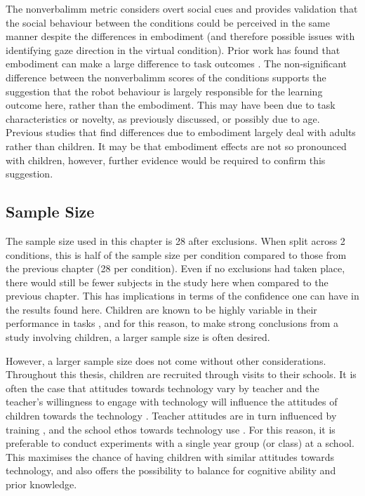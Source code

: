 The \gls{nonverbalimm} metric considers overt social cues and provides validation that the social behaviour between the conditions could be perceived in the same manner despite the differences in embodiment (and therefore possible issues with identifying gaze direction in the virtual condition). Prior work has found that embodiment can make a large difference to task outcomes \citep{bainbridge2008effect, leyzberg2014personalizing}. The non-significant difference between the \gls{nonverbalimm} scores of the conditions supports the suggestion that the robot behaviour is largely responsible for the learning outcome here, rather than the embodiment. This may have been due to task characteristics or novelty, as previously discussed, or possibly due to age. Previous studies that find differences due to embodiment largely deal with adults rather than children. It may be that embodiment effects are not so pronounced with children, however, further evidence would be required to confirm this suggestion.

\subsection{Sample Size}\label{sec:ch6-disc-sample}
The sample size used in this chapter is 28 after exclusions. When split across 2 conditions, this is half of the sample size per condition compared to those from the previous chapter (28 per condition). Even if no exclusions had taken place, there would still be fewer subjects in the study here when compared to the previous chapter. This has implications in terms of the confidence one can have in the results found here. Children are known to be highly variable in their performance in tasks \citep{siegler2007cognitive}, and for this reason, to make strong conclusions from a study involving children, a larger sample size is often desired.

However, a larger sample size does not come without other considerations. Throughout this thesis, children are recruited through visits to their schools. It is often the case that attitudes towards technology vary by teacher and the teacher's willingness to engage with technology will influence the attitudes of children towards the technology \citep{sariccoban2013pre,teo2006attitudes}. Teacher attitudes are in turn influenced by training \citep{teo2008pre}, and the school ethos towards technology use \citep{sipila2010impact}. For this reason, it is preferable to conduct experiments with a single year group (or class) at a school. This maximises the chance of having children with similar attitudes towards technology, and also offers the possibility to balance for cognitive ability and prior knowledge.

